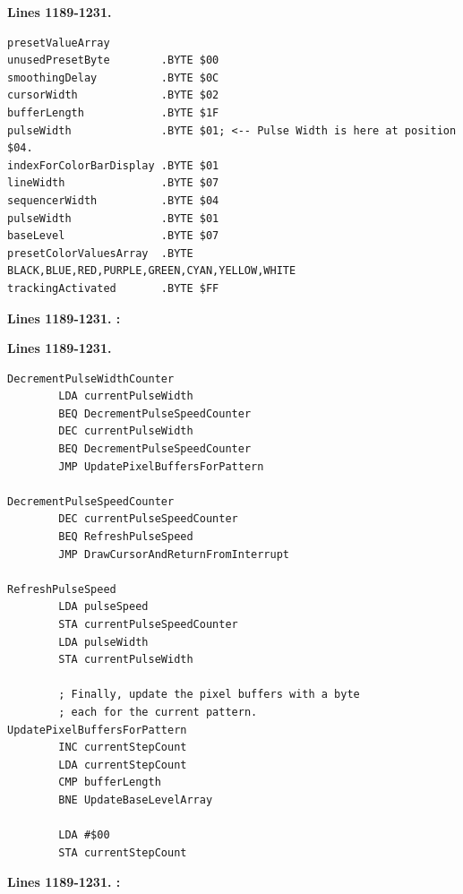 \textbf{Lines 1189-1231. } 
\begin{lstlisting}[basicstyle=\ttfamily\scriptsize,caption=From \icode{ActivateSequencer}.]
presetValueArray
unusedPresetByte        .BYTE $00
smoothingDelay          .BYTE $0C
cursorWidth             .BYTE $02
bufferLength            .BYTE $1F
pulseWidth              .BYTE $01; <-- Pulse Width is here at position $04.
indexForColorBarDisplay .BYTE $01
lineWidth               .BYTE $07
sequencerWidth          .BYTE $04 
pulseWidth              .BYTE $01
baseLevel               .BYTE $07
presetColorValuesArray  .BYTE BLACK,BLUE,RED,PURPLE,GREEN,CYAN,YELLOW,WHITE
trackingActivated       .BYTE $FF
\end{lstlisting}

\clearpage

\textbf{Lines 1189-1231. :} 
\clearpage


\clearpage
\textbf{Lines 1189-1231. } 
\begin{lstlisting}[caption=From \icode{MainInterruptHandler}.]
DecrementPulseWidthCounter   
        LDA currentPulseWidth
        BEQ DecrementPulseSpeedCounter
        DEC currentPulseWidth
        BEQ DecrementPulseSpeedCounter
        JMP UpdatePixelBuffersForPattern

DecrementPulseSpeedCounter   
        DEC currentPulseSpeedCounter
        BEQ RefreshPulseSpeed
        JMP DrawCursorAndReturnFromInterrupt

RefreshPulseSpeed   
        LDA pulseSpeed
        STA currentPulseSpeedCounter
        LDA pulseWidth
        STA currentPulseWidth

        ; Finally, update the pixel buffers with a byte
        ; each for the current pattern.        
UpdatePixelBuffersForPattern    
        INC currentStepCount
        LDA currentStepCount
        CMP bufferLength
        BNE UpdateBaseLevelArray

        LDA #$00
        STA currentStepCount

\end{lstlisting}
\clearpage

\textbf{Lines 1189-1231. :} 
\clearpage
